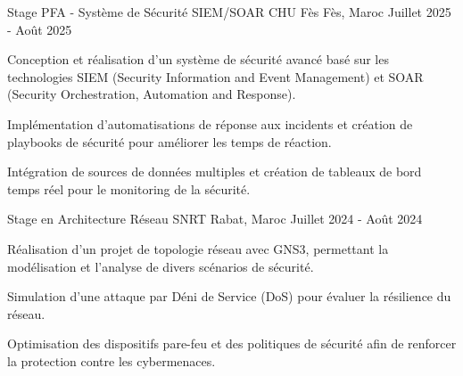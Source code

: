 

\begin{cventries}

  \cventry
  {Stage PFA - Système de Sécurité SIEM/SOAR} %
  {CHU Fès} %
  {Fès, Maroc} %
  {Juillet 2025 - Août 2025} %
  {
    \begin{cvitems} %
      \item {Conception et réalisation d'un système de sécurité avancé basé sur les technologies SIEM (Security Information and Event Management) et SOAR (Security Orchestration, Automation and Response).}
      \item {Implémentation d'automatisations de réponse aux incidents et création de playbooks de sécurité pour améliorer les temps de réaction.}
      \item {Intégration de sources de données multiples et création de tableaux de bord temps réel pour le monitoring de la sécurité.}
    \end{cvitems}
  }


\end{cventries}


\begin{cventries}

  \cventry
  {Stage en Architecture Réseau} %
  {SNRT} %
  {Rabat, Maroc} %
  {Juillet 2024 - Août 2024} %
  {
    \begin{cvitems} %
      \item {Réalisation d’un projet de topologie réseau avec GNS3, permettant la modélisation et l’analyse de divers scénarios de sécurité.}
      \item {Simulation d’une attaque par Déni de Service (DoS) pour évaluer la résilience du réseau.}
      \item {Optimisation des dispositifs pare-feu et des politiques de sécurité afin de renforcer la protection contre les cybermenaces.}
    \end{cvitems}
  }
\end{cventries}
